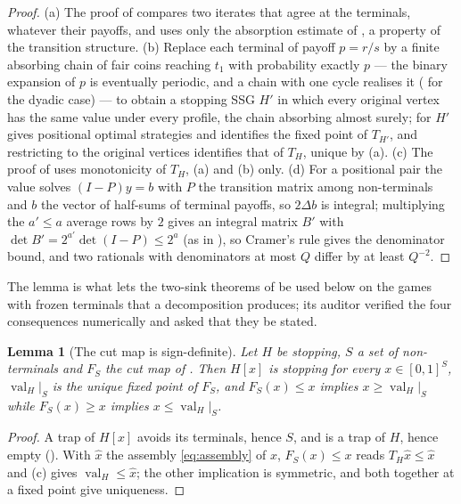 \documentclass[11pt]{article}
\theoremstyle{plain}
\newtheorem{lemma}[theorem]{Lemma}
\theoremstyle{definition}
\DeclareMathOperator{\val}{val}
\begin{document}
\begin{proof}
(a) The proof of  compares two iterates that agree
at the terminals, whatever their payoffs, and uses only the absorption
estimate of , a property of the transition structure.
(b) Replace each terminal of payoff $p=r/s$ by a finite absorbing chain of
fair coins reaching $t_1$ with probability exactly $p$ --- the binary
expansion of $p$ is eventually periodic, and a chain with one cycle
realises it ( for the dyadic case) --- to obtain a
stopping SSG $H'$ in which every original vertex has the same value under
every profile, the chain absorbing almost surely; 
for $H'$ gives positional optimal strategies and identifies the fixed
point of $T_{H'}$, and restricting to the original vertices identifies
that of $T_H$, unique by (a). (c) The proof of  uses
monotonicity of $T_H$, (a) and (b) only. (d) For a positional pair the value
solves $(I-P)y=b$ with $P$ the transition matrix among non-terminals and
$b$ the vector of half-sums of terminal payoffs, so $2\Delta b$ is
integral; multiplying the $a'\le a$ average rows by $2$ gives an integral
matrix $B'$ with $\det B'=2^{a'}\det(I-P)\le2^{a}$ (as in
), so Cramer's rule gives the denominator bound, and two rationals with denominators at most
$Q$ differ by at least $Q^{-2}$.
\end{proof}

The lemma is what lets the two-sink theorems of  be
used below on the games with frozen terminals that a decomposition
produces; its auditor verified the four consequences numerically and
asked that they be stated.

\begin{lemma}[The cut map is sign-definite]\label{lem:cut-sign}
Let $H$ be stopping, $S$ a set of non-terminals and $F_S$ the cut map of
. Then $H[x]$ is stopping for every $x\in[0,1]^{S}$,
$\val_H|_S$ is the unique fixed point of $F_S$, and $F_S(x)\le x$ implies
$x\ge\val_H|_S$ while $F_S(x)\ge x$ implies $x\le\val_H|_S$.
\end{lemma}

\begin{proof}
A trap of $H[x]$ avoids its terminals, hence $S$, and is a trap of $H$,
hence empty (). With $\hat x$ the assembly
\eqref{eq:assembly} of $x$, $F_S(x)\le x$ reads $T_H\hat x\le\hat x$ and
(c) gives $\val_H\le\hat x$; the other implication is
symmetric, and both together at a fixed point give uniqueness.
\end{proof}
\end{document}
